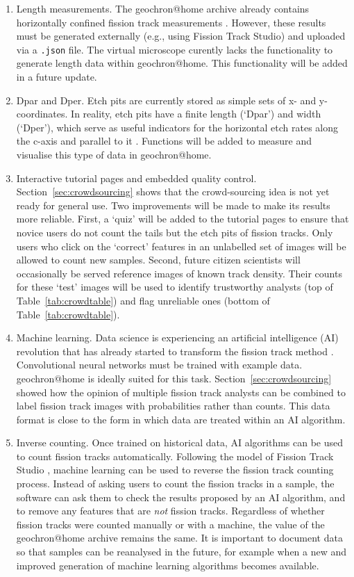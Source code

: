 \documentclass[gchron, manuscript]{copernicus}
\begin{document}
\begin{enumerate}
\item Length measurements. The geochron@home archive already
  contains horizontally confined fission track measurements
  \citep{tamer2025}.  However, these results must be generated
  externally (e.g., using Fission Track Studio) and uploaded via a
  \texttt{.json} file.  The virtual microscope curently lacks the
  functionality to generate length data within
  geochron@home. This functionality will be added in a future
  update.
\item Dpar and Dper. Etch pits are currently stored as simple sets of
  x- and y-coordinates.  In reality, etch pits have a finite length
  (`Dpar') and width (`Dper'), which serve as useful indicators for
  the horizontal etch rates along the c-axis and parallel to it
  \citep{donelick1993}. Functions will be added to measure and
  visualise this type of data in geochron@home.
\item Interactive tutorial pages and embedded quality
  control. Section~\ref{sec:crowdsourcing} shows that the
  crowd-sourcing idea is not yet ready for general use. Two
  improvements will be made to make its results more reliable. First,
  a `quiz' will be added to the tutorial pages to ensure that novice
  users do not count the tails but the etch pits of fission
  tracks. Only users who click on the `correct' features in an
  unlabelled set of images will be allowed to count new
  samples. Second, future citizen scientists will occasionally be
  served reference images of known track density. Their counts for
  these `test' images will be used to identify trustworthy analysts
  (top of Table~\ref{tab:crowdtable}) and flag unreliable ones (bottom
  of Table~\ref{tab:crowdtable}).
\item Machine learning. Data science is experiencing an artificial
  intelligence (AI) revolution that has already started to transform
  the fission track method \citep{nachtergaele2020}.  Convolutional
  neural networks must be trained with example data. geochron@home is
  ideally suited for this task. Section~\ref{sec:crowdsourcing} showed
  how the opinion of multiple fission track analysts can be combined
  to label fission track images with probabilities rather than
  counts. This data format is close to the form in which data are
  treated within an AI algorithm.
\item Inverse counting. Once trained on historical data, AI algorithms
  can be used to count fission tracks automatically. Following the
  model of Fission Track Studio \citep{gleadow2009, gleadow2019},
  machine learning can be used to reverse the fission track counting
  process. Instead of asking users to count the fission tracks in a
  sample, the software can ask them to check the results proposed by
  an AI algorithm, and to remove any features that are \emph{not}
  fission tracks.  Regardless of whether fission tracks were counted
  manually or with a machine, the value of the geochron@home archive
  remains the same. It is important to document data so that samples
  can be reanalysed in the future, for example when a new and improved
  generation of machine learning algorithms becomes available.
\end{enumerate}
\end{document}
